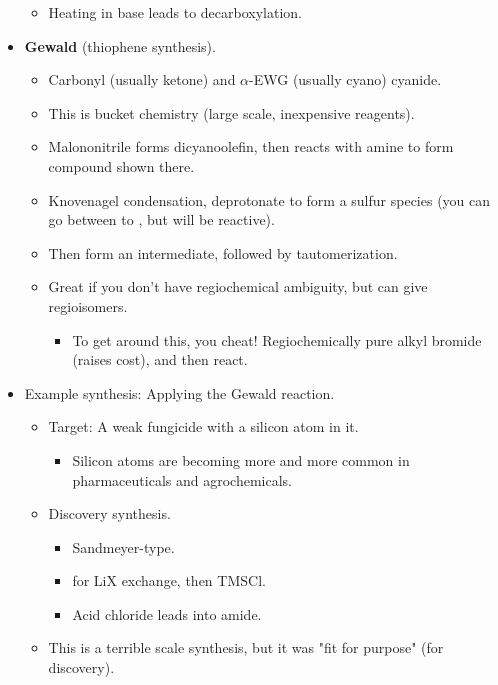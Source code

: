 \documentclass[../notes.tex]{subfiles}
\begin{document}
\begin{itemize}
\begin{itemize}
        \item Heating in base leads to decarboxylation.
    \end{itemize}
    \item \textbf{Gewald} (thiophene synthesis).
    \begin{itemize}
        \item Carbonyl (usually ketone) and $\alpha$-EWG (usually cyano) cyanide.
        \item This is bucket chemistry (large scale, inexpensive reagents).
        \item Malononitrile forms dicyanoolefin, then reacts with amine to form compound shown there.
        \item Knovenagel condensation, deprotonate to form a sulfur species (you can go between  to , but  will be reactive).
        \item Then form an intermediate, followed by tautomerization.
        \item Great if you don't have regiochemical ambiguity, but can give regioisomers.
        \begin{itemize}
            \item To get around this, you cheat! Regiochemically pure alkyl bromide (raises cost), and then react.
        \end{itemize}
    \end{itemize}
    \item Example synthesis: Applying the Gewald reaction.
    \begin{itemize}
        \item Target: A weak fungicide with a silicon atom in it.
        \begin{itemize}
            \item Silicon atoms are becoming more and more common in pharmaceuticals and agrochemicals.
        \end{itemize}
        \item Discovery synthesis.
        \begin{itemize}
            \item Sandmeyer-type.
            \item {} for LiX exchange, then TMSCl.
            \item Acid chloride leads into amide.
        \end{itemize}
        \item This is a terrible scale synthesis, but it was "fit for purpose" (for discovery).
        \begin{itemize}

\end{itemize}
\end{itemize}
\end{itemize}
\end{document}
